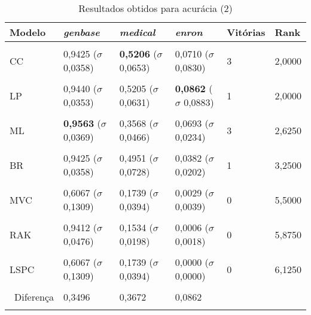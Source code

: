 \begin{table}[htbp]
	\centering
	\caption{Resultados obtidos para acurácia (2)}
		\begin{tabular}
        { p{0.88in} p{0.88in} p{0.88in} p{0.88in} p{0.88in} p{0.88in} }
        
        \hline
Modelo & \textit{genbase} & \textit{medical} & \textit{enron} & \textbf{Vitórias} & \textbf{Rank} \\ 
\hline \\

CC & 0,9425 \newline ($\sigma$ 0,0358) & \textbf{0,5206} \newline ($\sigma$ 0,0653) & 0,0710 \newline ($\sigma$ 0,0830) & 3 & 2,0000 \\ \\
LP & 0,9440 \newline ($\sigma$ 0,0353) & 0,5205 \newline ($\sigma$ 0,0631) & \textbf{0,0862} \newline ($\sigma$ 0,0883) & 1 & 2,0000 \\ \\
ML & \textbf{0,9563} \newline ($\sigma$ 0,0369) & 0,3568 \newline ($\sigma$ 0,0466) & 0,0693 \newline ($\sigma$ 0,0234) & 3 & 2,6250 \\ \\
BR & 0,9425 \newline ($\sigma$ 0,0358) & 0,4951 \newline ($\sigma$ 0,0728) & 0,0382 \newline ($\sigma$ 0,0202) & 1 & 3,2500 \\ \\
MVC & 0,6067 \newline ($\sigma$ 0,1309) & 0,1739 \newline ($\sigma$ 0,0394) & 0,0029 \newline ($\sigma$ 0,0039) & 0 & 5,5000 \\ \\
RAK & 0,9412 \newline ($\sigma$ 0,0476) & 0,1534 \newline ($\sigma$ 0,0198) & 0,0006 \newline ($\sigma$ 0,0018) & 0 & 5,8750 \\ \\
LSPC & 0,6067 \newline ($\sigma$ 0,1309) & 0,1739 \newline ($\sigma$ 0,0394) & 0,0000 \newline ($\sigma$ 0,0000) & 0 & 6,1250 \\ \\

\hline \ 
 Diferença & 0,3496 & 0,3672 & 0,0862 &  &  \\ 
\hline \\

        \end{tabular}
	\label{tab:metricsForAccuracy_2}
\end{table}
